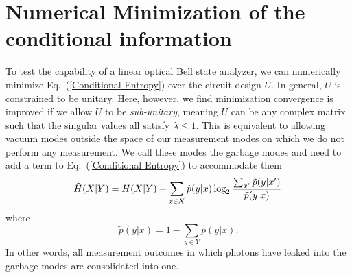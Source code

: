 \documentclass[aps,pra,twocolumn,showpacs,superscriptaddress,floatfix,10pt]{revtex4}
\begin{document}
\section{Numerical Minimization of the conditional information}
\label{Section on Numerical Minimization}
To test the capability of a linear optical Bell state analyzer, we can numerically minimize Eq.~(\ref{Conditional Entropy}) over the circuit design $U$. In general, $U$ is constrained to be unitary. Here, however, we find minimization convergence is improved if we allow $U$ to be \textit{sub-unitary}, meaning $U$ can be any complex matrix such that the singular values all satisfy $\lambda \le 1$. This is equivalent to allowing vacuum modes outside the space of our measurement modes on which we do not perform any measurement. We call these modes the garbage modes and need to add a term to Eq.~(\ref{Conditional Entropy}) to accommodate them
\begin{equation}
\label{Condition Information with Garbage modes}
\small	\tilde{H}(X|Y) = H(X|Y) + \sum_{x \in X} \tilde{p}(y|x) \log_2 \frac{\sum_{x^\prime} \tilde{p}(y|x^\prime)}{\tilde{p}(y|x)}\,
\end{equation}
where
\begin{equation}
	\tilde{p}(y|x) = 1 - \sum_{y \in Y} p(y|x).
\end{equation}
In other words, all measurement outcomes in which photons have leaked into the garbage modes are consolidated into one.
\end{document}
